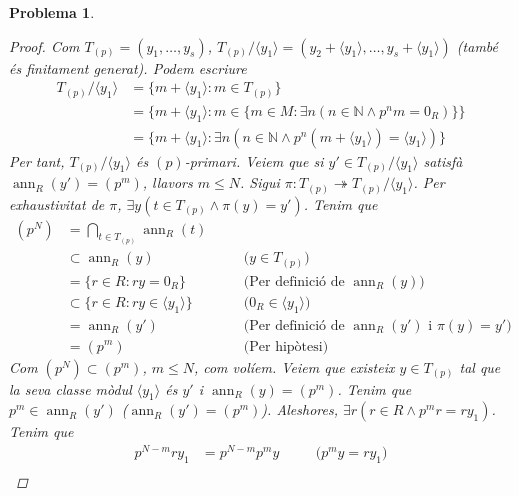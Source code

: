 \documentclass[compress]{article}
\newtheorem{problema}{Problema}
\theoremstyle{definition}
\DeclareMathOperator{\ann}{ann}
\begin{document}
\begin{problema}
\begin{enumerate}
        \begin{proof}
            Com $T_{(p)}=(y_{1},\ldots,y_{s})$, $T_{(p)}/\langle y_{1}\rangle=(y_{2}+\langle y_{1}\rangle,\ldots,y_{s}+\langle y_{1}\rangle)$ (també és finitament generat). Podem escriure
            \begin{align*}
                T_{(p)}/\langle y_{1}\rangle
                &=\{m+\langle y_{1}\rangle:m\in T_{(p)}\}\\
                &=\{m+\langle y_{1}\rangle:m\in\{m\in M:\exists n(n\in\mathbb{N}\land p^{n}m=0_{R})\}\}\\
                &=\{m+\langle y_{1}\rangle:\exists n(n\in\mathbb{N}\land p^{n}(m+\langle y_{1}\rangle)=\langle y_{1}\rangle)\}
            \end{align*}
            Per tant, $T_{(p)}/\langle y_{1}\rangle$ és $(p)$-primari.\newline
            Veiem que si $y'\in T_{(p)}/\langle y_{1}\rangle$ satisfà $\ann_{R}(y')=(p^{m})$, llavors $m\leq N$. Sigui $\pi:T_{(p)}\twoheadrightarrow T_{(p)}/\langle y_{1}\rangle$. Per exhaustivitat de $\pi$, $\exists y(t\in T_{(p)}\land\pi(y)=y')$. Tenim que
            \begin{align*}
                (p^{N})
                &=\bigcap_{t\in T_{(p)}}\ann_{R}(t)\\
                &\subset\ann_{R}(y)
                &\quad&\textrm{($y\in T_{(p)}$)}\\
                &=\{r\in R:ry=0_{R}\}
                &\quad&\textrm{(Per definició de $\ann_{R}(y)$)}\\
                &\subset\{r\in R:ry\in\langle y_{1}\rangle\}
                &\quad&\textrm{($0_{R}\in\langle y_{1}\rangle$)}\\
                &=\ann_{R}(y')
                &\quad&\textrm{(Per definició de $\ann_{R}(y')$ i $\pi(y)=y'$)}\\
                &=(p^{m})
                &\quad&\textrm{(Per hipòtesi)}
            \end{align*}
            Com $(p^{N})\subset(p^{m})$, $m\leq N$, com volíem.\newline
            Veiem que existeix $y\in T_{(p)}$ tal que la seva classe mòdul $\langle y_{1}\rangle$ és $y'$ i $\ann_{R}(y)=(p^{m})$. Tenim que $p^{m}\in\ann_{R}(y')$ ($\ann_{R}(y')=(p^{m})$). Aleshores, $\exists r(r\in R\land p^{m}r=ry_{1})$. Tenim que
            \begin{align*}
                p^{N-m}ry_{1}
                &=p^{N-m}p^{m}y
                &\quad&\textrm{($p^{m}y=ry_{1}$)}\\

\end{align*}
\end{proof}
\end{enumerate}
\end{problema}
\end{document}
